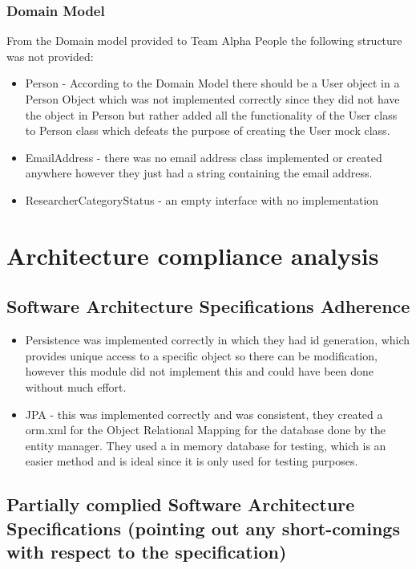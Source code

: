\documentclass{article}
\begin{document}
	\subsubsection{Domain Model}
	From the Domain model provided to Team Alpha People the following structure was not provided:
	\begin{itemize}
		\item Person - According to the Domain Model there should be a User object in a Person Object which was not implemented correctly since they did not have the object in Person but rather added all the functionality of the User class to Person class which defeats the purpose of creating the User mock class.
		\item EmailAddress - there was no email address class implemented or created anywhere however they just had a string containing the email address.
		\item ResearcherCategoryStatus - an empty interface with no implementation
	\end{itemize}
	\newpage
	\section{Architecture compliance analysis}
	\subsection{Software Architecture Specifications Adherence}
	\begin{itemize}
		
		\item Persistence was implemented correctly in which they had id generation, which provides unique access to a specific object so there can be modification, however this module did not implement this and could have been done without much effort. 
		\item JPA - this was implemented correctly and was consistent, they created a orm.xml for the Object Relational Mapping for the database done by the entity manager. They used a in memory database for testing, which is an easier method and is ideal since it is only used for testing purposes.
		
	\end{itemize}
	
	\subsection{Partially complied Software Architecture Specifications (pointing out any short-comings with respect to the specification)}
	
\end{document}
